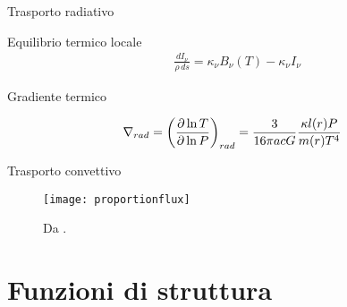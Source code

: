 \begin{frame}{Trasporto radiativo}

\begin{block}{Equilibrio termico locale}
\begin{align*}
&\frac{dI_{\nu}}{\rho\,ds}=\kappa_{\nu}B_{\nu}(T)-\kappa_{\nu}I_{\nu}
\end{align*}
\end{block}

\begin{block}{Gradiente termico}

\begin{equation*}
\nrad{}=\Dcvar{\PDly{P}{T}}{rad}=\frac{3}{16\pi acG}\frac{\kappa l(r)P}{m(r)T^4}%
\end{equation*}

\end{block}

\end{frame}

\begin{frame}{Trasporto convettivo}

\begin{figure}[!h]
    \texttt{[image: proportionflux]}
    \caption{Da \cite{gou76convection}.}
    \label{fluxproportion}
\end{figure}

\end{frame}


\section{Funzioni di struttura}

